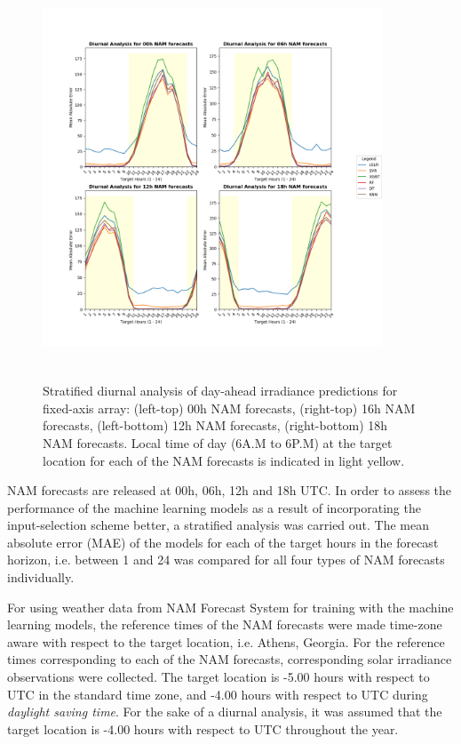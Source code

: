 \begin{figure}[ht]
    \begin{center}
    	\includegraphics[width=0.9\textwidth, height=12cm]{chapter3/fig_diurnal_arrayb.png}
    	\caption[Stratified diurnal analysis of day-ahead irradiance predictions for fixed-axis solar array]{Stratified diurnal analysis of day-ahead irradiance predictions for fixed-axis array: (left-top) 00h NAM forecasts, (right-top) 16h NAM forecasts, (left-bottom) 12h NAM forecasts, (right-bottom) 18h NAM forecasts. Local time of day (6A.M to 6P.M) at the target location for each of the NAM forecasts is indicated in light yellow.}
    	\label{fig:fig_stratified_diurnal}
    \end{center}
\end{figure}

\par NAM forecasts are released at 00h, 06h, 12h and 18h UTC. In order to assess the performance of the machine learning models as a result of incorporating the input-selection scheme better, a stratified analysis was carried out. The mean absolute error (MAE) of the models for each of the target hours in the forecast horizon, i.e. between 1 and 24 was compared for all four types of NAM forecasts individually.

\par For using weather data from NAM Forecast System for training with the machine learning models, the reference times of the NAM forecasts were made time-zone aware with respect to the target location, i.e. Athens, Georgia. For the reference times corresponding to each of the NAM forecasts, corresponding solar irradiance observations were collected. The target location is -5.00 hours with respect to UTC in the standard time zone, and -4.00 hours with respect to UTC during \textit{daylight saving time}. For the sake of a diurnal analysis, it was assumed that the target location is -4.00 hours with respect to UTC throughout the year. 

